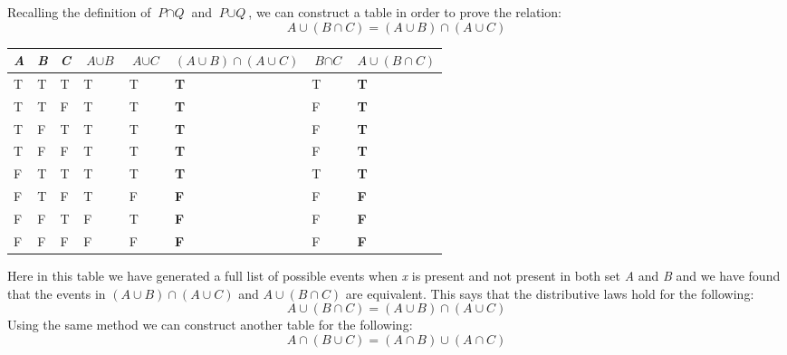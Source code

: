 \documentclass[a4paper,12pt]{article}
\begin{document}
    Recalling the definition of $\textit{P} \cap \textit{Q}$ and $\textit{P} \cup \textit{Q}$, we can construct a table in order to prove the relation:
    $$\textit{A} \cup (\textit{B} \cap \textit{C}) = ( \textit{A} \cup \textit{B} ) \cap ( \textit{A} \cup \textit{C} )$$
    \begin{table}[H]
        \begin{center}
            \begin{tabular}{| l | l | l | l | l | l | l | l |}
                \midrule
                \textit{A}& \textit{B}& \textit{C} & $\textit{A} \cup \textit{B}$ & $\textit{A} \cup \textit{C}$ & \textbf{$(\textit{A} \cup \textit{B}) \cap (\textit{A} \cup \textit{C})$} & $\textit{B} \cap \textit{C}$ & \textbf{$\textit{A} \cup (\textit{B} \cap \textit{C})$}\\
                \midrule\midrule
                T & T & T & T & T & \textbf{T} & T & \textbf{T}\\
                \midrule
                T & T & F & T & T & \textbf{T} & F & \textbf{T}\\
                \midrule
                T & F & T & T & T & \textbf{T} & F & \textbf{T}\\
                \midrule
                T & F & F & T & T & \textbf{T} & F & \textbf{T}\\
                \midrule
                F & T & T & T & T & \textbf{T} & T & \textbf{T}\\
                \midrule
                F & T & F & T & F & \textbf{F} & F & \textbf{F}\\
                \midrule
                F & F & T & F & T & \textbf{F} & F & \textbf{F}\\
                \midrule
                F & F & F & F & F & \textbf{F} & F & \textbf{F}\\
                \midrule
            \end{tabular}
        \end{center}
    \end{table}
    Here in this table we have generated a full list of possible events when \textit{x} is present and not present in both set \textit{A} and \textit{B} and we have found that the events in $( \textit{A} \cup \textit{B} ) \cap ( \textit{A} \cup \textit{C} )$ and $\textit{A} \cup (\textit{B} \cap \textit{C})$ are equivalent.
    This says that the distributive laws hold for the following:
    $$ \textit{A} \cup (\textit{B} \cap \textit{C}) = ( \textit{A} \cup \textit{B} ) \cap ( \textit{A} \cup \textit{C} )$$
    Using the same method we can construct another table for the following:
    $$ \textit{A} \cap (\textit{B} \cup \textit{C}) = (\textit{A} \cap \textit{B}) \cup (\textit{A} \cap \textit{C}) $$
\end{document}
